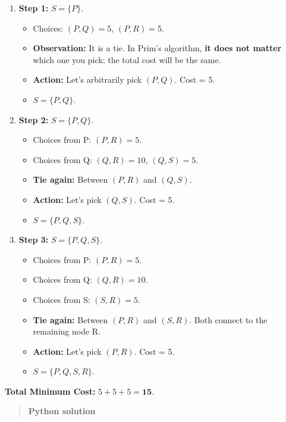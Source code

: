 \documentclass[
  letterpaper,
  DIV=11,
  numbers=noendperiod]{scrreprt}
\providecommand{\tightlist}{%
  \setlength{\itemsep}{0pt}\setlength{\parskip}{0pt}}
\begin{document}
\begin{enumerate}
\def\labelenumi{\arabic{enumi}.}
\tightlist
\item
  \textbf{Step 1:} \(S = \{P\}\).

  \begin{itemize}
  \tightlist
  \item
    Choices: \((P, Q)=5\), \((P, R)=5\).
  \item
    \textbf{Observation:} It is a tie. In Prim's algorithm, \textbf{it
    does not matter} which one you pick; the total cost will be the
    same.
  \item
    \textbf{Action:} Let's arbitrarily pick \textbf{\((P, Q)\)}. Cost =
    5.
  \item
    \(S = \{P, Q\}\).
  \end{itemize}
\item
  \textbf{Step 2:} \(S = \{P, Q\}\).

  \begin{itemize}
  \tightlist
  \item
    Choices from P: \((P, R)=5\).
  \item
    Choices from Q: \((Q, R)=10\), \((Q, S)=5\).
  \item
    \textbf{Tie again:} Between \((P, R)\) and \((Q, S)\).
  \item
    \textbf{Action:} Let's pick \textbf{\((Q, S)\)}. Cost = 5.
  \item
    \(S = \{P, Q, S\}\).
  \end{itemize}
\item
  \textbf{Step 3:} \(S = \{P, Q, S\}\).

  \begin{itemize}
  \tightlist
  \item
    Choices from P: \((P, R)=5\).
  \item
    Choices from Q: \((Q, R)=10\).
  \item
    Choices from S: \((S, R)=5\).
  \item
    \textbf{Tie again:} Between \((P, R)\) and \((S, R)\). Both connect
    to the remaining node R.
  \item
    \textbf{Action:} Let's pick \textbf{\((P, R)\)}. Cost = 5.
  \item
    \(S = \{P, Q, S, R\}\).
  \end{itemize}
\end{enumerate}

\textbf{Total Minimum Cost:} \(5 + 5 + 5 = \mathbf{15}\).

\begin{quote}
\textbf{Python solution}
\end{quote}
\end{document}
